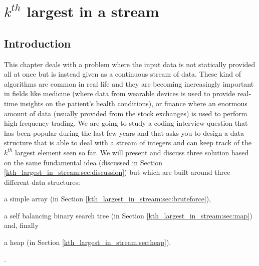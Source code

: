 %

\chapter{$k^{th}$ largest in a stream}
\label{ch:kth_largest_in_stream}
\section*{Introduction}
This chapter deals with a problem where the input data is not statically provided all at once but
 is instead given as a continuous stream of data. These kind of algorithms are common in real life
 and they are becoming increasingly important in fields like medicine (where data from wearable
 devices is used to provide real-time insights on the patient's health conditions), or finance where
 an enormous amount of data (usually provided from the stock exchanges) is used to perform high-frequency
 trading. We are going to study a coding interview question that has been popular during the
 last few years and that asks you to design a data structure that is able to deal with a
 stream of integers and can keep track of the $k^{th}$ largest element seen so far. We will
 present and discuss three solution based on the same fundamental idea (discussed in Section
 \ref{kth_largest_in_stream:sec:discussion}) but which are built around three different data structures:
 
\begin{enumerate*}
	\item a simple array (in Section \ref{kth_largest_in_stream:sec:bruteforce}), 
	\item a self balancing binary search tree (in Section \ref{kth_largest_in_stream:sec:map})  and,
	finally 
	\item a heap (in Section \ref{kth_largest_in_stream:sec:heap}). \end{enumerate*}.

